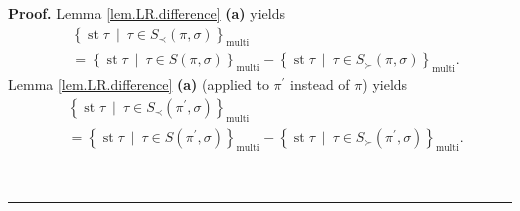 \documentclass[numbers=enddot,12pt,final,onecolumn,notitlepage]{scrartcl}%
\theoremstyle{definition}
\newenvironment{proof}[1][Proof]{\noindent\textbf{#1.} }{\ \rule{0.5em}{0.5em}}
\begin{document}
\begin{proof}
Lemma \ref{lem.LR.difference} \textbf{(a)} yields%
\begin{align}
&  \left\{  \operatorname{st} \tau   \ \mid\ \tau\in S_{\prec
}\left(  \pi,\sigma\right)  \right\}  _{\operatorname*{multi}}\nonumber\\
&  =\left\{  \operatorname{st} \tau   \ \mid\ \tau\in S\left(
\pi,\sigma\right)  \right\}  _{\operatorname*{multi}}-\left\{
\operatorname{st} \tau   \ \mid\ \tau\in S_{\succ}\left(
\pi,\sigma\right)  \right\}  _{\operatorname*{multi}}.
\label{pf.thm.head-comp.LRcomp.c1.pf.7}%
\end{align}
Lemma \ref{lem.LR.difference} \textbf{(a)} (applied to $\pi^{\prime}$ instead
of $\pi$) yields%
\begin{align}
&  \left\{  \operatorname{st} \tau   \ \mid\ \tau\in S_{\prec
}\left(  \pi^{\prime},\sigma\right)  \right\}  _{\operatorname*{multi}%
}\nonumber\\
&  =\left\{  \operatorname{st} \tau   \ \mid\ \tau\in S\left(
\pi^{\prime},\sigma\right)  \right\}  _{\operatorname*{multi}}-\left\{
\operatorname{st} \tau   \ \mid\ \tau\in S_{\succ}\left(
\pi^{\prime},\sigma\right)  \right\}  _{\operatorname*{multi}}.
\label{pf.thm.head-comp.LRcomp.c1.pf.8}%
\end{align}



\end{proof}
\end{document}
